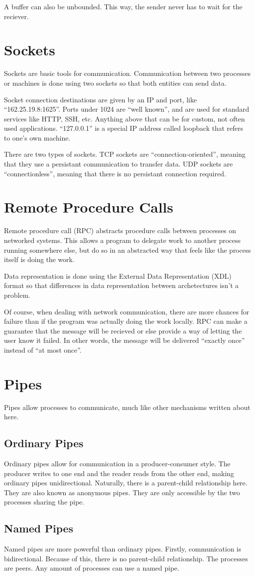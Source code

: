\documentclass{article}
\begin{document}
A buffer can also be unbounded. This way, the sender never has to wait for the
reciever.

\section{Sockets}
Sockets are basic tools for communication. Communication between two processes
or machines is done using two sockets so that both entities can send data.

Socket connection destinations are given by an IP and port, like
``162.25.19.8:1625''. Ports under 1024 are ``well known'', and are used for
standard services like HTTP, SSH, etc. Anything above that can be for custom,
not often used applications. ``127.0.0.1'' is a special IP address called
loopback that refers to one's own machine.

There are two types of sockets. TCP sockets are ``connection-oriented'',
meaning that they use a persistant communication to transfer data. UDP sockets
are ``connectionless'', meaning that there is no persistant connection
required.

\section{Remote Procedure Calls}
Remote procedure call (RPC) abstracts procedure calls between processes on
networked systems. This allows a program to delegate work to another process
running somewhere else, but do so in an abstracted way that feels like the
process itself is doing the work.

Data representation is done using the External Data Representation (XDL) format
so that differences in data representation between archetectures isn't a
problem.

Of course, when dealing with network communication, there are more chances for
failure than if the program was actually doing the work locally. RPC can make a
guarantee that the message will be recieved or else provide a way of letting
the user know it failed. In other words, the message will be delivered
``exactly once'' instead of ``at most once''.

\section{Pipes}
Pipes allow processes to communicate, much like other mechanisms written about
here.

\subsection{Ordinary Pipes}
Ordinary pipes allow for communication in a producer-consumer style. The
producer writes to one end and the reader reads from the other end, making
ordinary pipes unidirectional. Naturally, there is a parent-child relationship
here. They are also known as anonymous pipes. They are only accessible by the
two processes sharing the pipe.

\subsection{Named Pipes}
Named pipes are more powerful than ordinary pipes. Firstly, communication is
bidirectional. Because of this, there is no parent-child relationship. The
processes are peers. Any amount of processes can use a named pipe.
\end{document}
